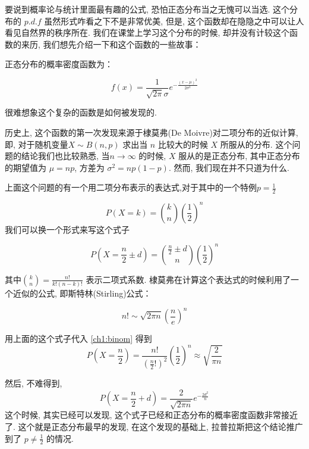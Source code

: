 
要说到概率论与统计里面最有趣的公式, 恐怕正态分布当之无愧可以当选. 这个分布的 $p.d.f$ 虽然形式咋看之下不是非常优美, 但是, 这个函数却在隐隐之中可以让人看见自然界的秩序所在. 我们在课堂上学习这个分布的时候, 却并没有计较这个函数的来历, 我们想先介绍一下和这个函数的一些故事：

		正态分布的概率密度函数为：

		\begin{equation}
			f(x) = \frac{1}{\sqrt{2 \pi} \sigma} e^{-\frac{(x-\mu)^2}{2 \sigma^2}} 	
		\end{equation}
	
		
		很难想象这个复杂的函数是如何被发现的. 
		
		历史上, 这个函数的第一次发现来源于棣莫弗(De Moivre)对二项分布的近似计算, 即, 对于随机变量$X \sim B(n, p)$ 求出当 $n$ 比较大的时候 $X$ 所服从的分布. 这个问题的结论我们也比较熟悉, 当$n\rightarrow\infty$ 的时候, $X$ 服从的是正态分布, 其中正态分布的期望值为 $\mu = np $, 方差为 $\sigma^2 = np(1-p)$. 然而, 我们现在并不只道为什么. 

				上面这个问题的有一个用二项分布表示的表达式,对于其中的一个特例$p = \frac{1}{2}$
				
					\begin{equation}\label{ch1:binom}
						P(X = k) = \binom{k}{n} (\frac{1}{2})^n
					\end{equation}
				我们可以换一个形式来写这个式子				
				
					\begin{equation}\label{ch1:binom}
						P(X = \frac{n}{2} \pm d) = \binom{\frac{n}{2} \pm d}{n} (\frac{1}{2})^n
					\end{equation}		
								
				其中$\binom{k}{n} = \frac{n!}{k! (n-k)!}$ 表示二项式系数. 棣莫弗在计算这个表达式的时候利用了一个近似的公式, 即斯特林(Stirling)公式：
				
					\begin{equation}
						n! \sim \sqrt{2\pi n} (\frac{n}{e})^n
					\end{equation}
				
								
				用上面的这个式子代入 \ref{ch1:binom} 得到
					\begin{equation}
						P(X = \frac{n}{2}) = \frac{n!}{(\frac{n}{2}!)^2} (\frac{1}{2}) ^n \approx \sqrt{\frac{2}{\pi n}}
					\end{equation}
					
				然后, 不难得到, 
					\begin{equation}
						P(X = \frac{n}{2} + d) = \frac{2}{\sqrt{2 \pi n}} e^{-\frac{2d^2}{n}}
					\end{equation}
				这个时候, 其实已经可以发现, 这个式子已经和正态分布的概率密度函数非常接近了. 这个就是正态分布最早的发现, 在这个发现的基础上, 拉普拉斯把这个结论推广到了 $p \neq \frac{1}{2}$ 的情况. 
				
